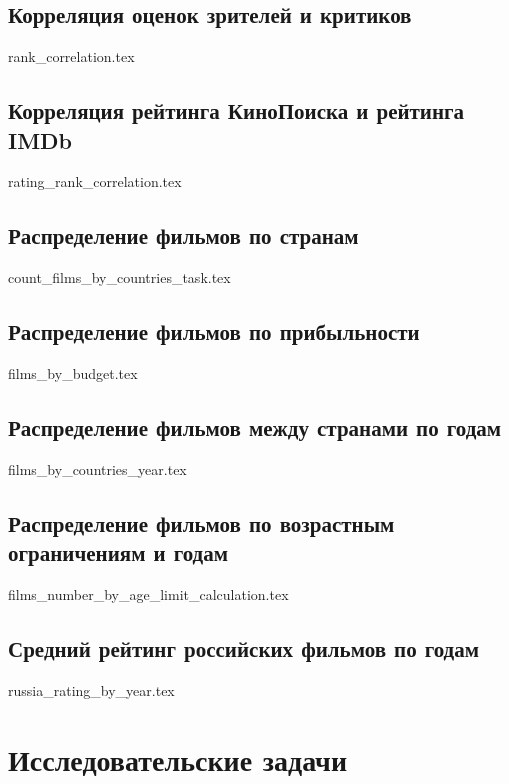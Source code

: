 \documentclass[9pt,conference]{IEEEtran}
\begin{document}
\subsection{Корреляция оценок зрителей и критиков}

{rank_correlation.tex}

\subsection{Корреляция рейтинга КиноПоиска и рейтинга IMDb}

{rating_rank_correlation.tex}

\subsection{Распределение фильмов по странам}

{count_films_by_countries_task.tex}

\subsection{Распределение фильмов по прибыльности}

{films_by_budget.tex}

\subsection{Распределение фильмов между странами по годам}

{films_by_countries_year.tex}

\subsection{Распределение фильмов по возрастным ограничениям и годам}

{films_number_by_age_limit_calculation.tex}

\subsection{Средний рейтинг российских фильмов по годам}

{russia_rating_by_year.tex}

\section{Исследовательские задачи}
\end{document}
